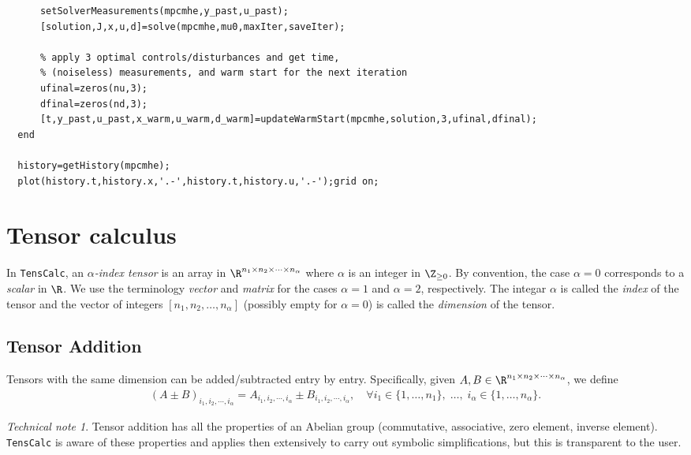 \documentclass[11pt]{article}
\newcommand{\TC}{\texttt{TensCalc}}
\theoremstyle{remark}
\newtheorem{technical}{Technical note}
\begin{document}
\begin{lstlisting}
      setSolverMeasurements(mpcmhe,y_past,u_past);
      [solution,J,x,u,d]=solve(mpcmhe,mu0,maxIter,saveIter);
    
      % apply 3 optimal controls/disturbances and get time,
      % (noiseless) measurements, and warm start for the next iteration
      ufinal=zeros(nu,3);
      dfinal=zeros(nd,3);
      [t,y_past,u_past,x_warm,u_warm,d_warm]=updateWarmStart(mpcmhe,solution,3,ufinal,dfinal); 
  end

  history=getHistory(mpcmhe);
  plot(history.t,history.x,'.-',history.t,history.u,'.-');grid on;

\end{lstlisting}




\newpage

\appendix

\section{Tensor calculus}
\label{se:tensor-calculus}

In \TC{}, an \emph{$\alpha$-index tensor} is an array in $\R^{n_1\times n_2\times\cdots\times
  n_\alpha}$ where $\alpha$ is an integer in $\Z_{\ge 0}$. By convention, the case
$\alpha=0$ corresponds to a \emph{scalar} in $\R$. We use the terminology
\emph{vector} and \emph{matrix} for the cases $\alpha=1$ and $\alpha=2$,
respectively. The integar $\alpha$ is called the \emph{index} of the tensor
and the vector of integers $[n_1,n_2,\dots,n_\alpha]$ (possibly empty for
$\alpha=0$) is called the \emph{dimension} of the tensor.


\subsection{Tensor Addition}

Tensors with the same dimension can be added/subtracted entry by
entry. Specifically, given $A,B\in \R^{n_1\times n_2\times\cdots\times n_\alpha}$, we define
\begin{align*}
  (A\pm B)_{i_1,i_2,\cdots,i_\alpha}=A_{i_1,i_2,\cdots,i_\alpha}\pm B_{i_1,i_2,\cdots,i_\alpha}, \quad
  \forall i_1\in\{1,\dots,n_1\},\;\dots,\;i_\alpha\in\{1,\dots,n_\alpha\}.
\end{align*}

\begin{technical}
  Tensor addition has all the properties of an Abelian group
  (commutative, associative, zero element, inverse element).  \TC{} is
  aware of these properties and applies then extensively to carry out
  symbolic simplifications, but this is transparent to the user.
  \frqed
\end{technical}
\end{document}
